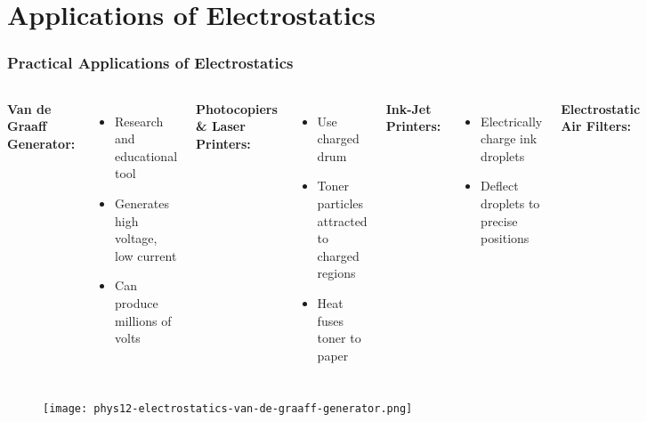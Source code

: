 \documentclass{beamer}
\begin{document}
\section{Applications of Electrostatics}

\begin{frame}
    \frametitle{Practical Applications of Electrostatics}
    
    \begin{columns}[t]
        \textbf{Van de Graaff Generator:}
        \begin{itemize}
            \item Research and educational tool
            \item Generates high voltage, low current
            \item Can produce millions of volts
        \end{itemize}
        
        \textbf{Photocopiers \& Laser Printers:}
        \begin{itemize}
            \item Use charged drum
            \item Toner particles attracted to charged regions
            \item Heat fuses toner to paper
        \end{itemize}
        
        \textbf{Ink-Jet Printers:}
        \begin{itemize}
            \item Electrically charge ink droplets
            \item Deflect droplets to precise positions
        \end{itemize}
        
        \textbf{Electrostatic Air Filters:}
        \begin{itemize}
            \item Charge air particles
            \item Attract charged particles to plates
            \item Remove pollutants from air
        \end{itemize}
    \end{columns}
\end{frame}

\begin{frame}{}
    \begin{figure}
        \centering
        \texttt{[image: phys12-electrostatics-van-de-graaff-generator.png]}
    \end{figure}
\end{frame}
\end{document}
